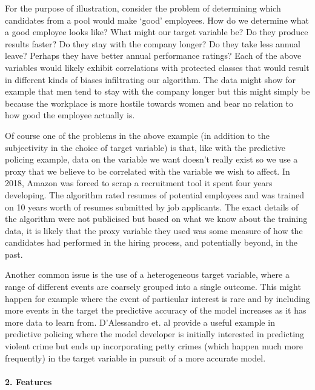 For the purpose of illustration, consider the problem of determining which candidates from a pool would make `good' employees. How do we determine what a good employee looks like? What might our target variable be? Do they produce results faster? Do they stay with the company longer? Do they take less annual leave? Perhaps they have better annual performance ratings? Each of the above variables would likely exhibit correlations with protected classes that would result in different kinds of biases infiltrating our algorithm. The data might show for example that men tend to stay with the company longer but this might simply be because the workplace is more hostile towards women and bear no relation to how good the employee actually is.

Of course one of the problems in the above example (in addition to the subjectivity in the choice of target variable) is that, like with the predictive policing example, data on the variable we want doesn't really exist so we use a proxy that we believe to be correlated with the variable we wish to affect. In 2018, Amazon was forced to scrap a recruitment tool it spent four years developing. The algorithm rated resumes of potential employees and was trained on 10 years worth of resumes submitted by job applicants. The exact details of the algorithm were not publicised but based on what we know about the training data, it is likely that the proxy variable they used was some measure of how the candidates had performed in the hiring process, and potentially beyond, in the past.

Another common issue is the use of a heterogeneous target variable, where a range of different events are coarsely grouped into a single outcome. This might happen for example where the event of particular interest is rare and by including more events in the target the predictive accuracy of the model increases as it has more data to learn from. D'Alessandro et. al\cite{ConsClfn} provide a useful example in predictive policing where the model developer is initially interested in predicting violent crime but ends up incorporating petty crimes (which happen much more frequently) in the target variable in pursuit of a more accurate model.

\paragraph*{2. Features}


